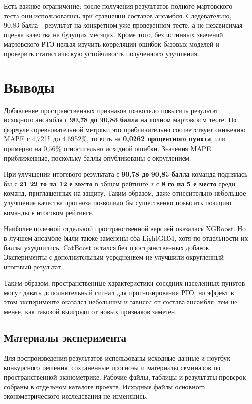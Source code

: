 \documentclass[12pt, a4paper]{article}
\begin{document}
Есть важное ограничение: после получения результатов полного мартовского теста они использовались при сравнении составов ансамбля.
Следовательно, 90,83 балла - результат на конкретном уже проверенном тесте, а не независимая оценка качества на будущих месяцах.
Кроме того, без истинных значений мартовского РТО нельзя изучить корреляции ошибок базовых моделей и проверить статистическую
устойчивость полученного улучшения.

\clearpage

\section*{Выводы}

Добавление пространственных признаков позволило повысить результат исходного ансамбля с \textbf{90,78 до 90,83 балла}
на полном мартовском тесте. По формуле соревновательной метрики это приблизительно соответствует снижению MAPE с 4,7215 до 4,6952\%,
то есть на \textbf{0,0262 процентного пункта}, или примерно на 0,56\% относительно исходной ошибки.
Значения MAPE приближенные, поскольку баллы опубликованы с округлением.

При улучшении итогового результата с \textbf{90,78 до 90,83 балла} команда поднялась бы с \textbf{21-22-го на 12-е место}
в общем рейтинге и с \textbf{8-го на 5-е место} среди команд, приглашенных на защиту.
Таким образом, даже относительно небольшое улучшение качества прогноза позволило бы существенно повысить позицию команды в
итоговом рейтинге.

Наиболее полезной отдельной пространственной версией оказалась XGBoost. Но в лучшем ансамбле были также заменены
оба LightGBM, хотя по отдельности их баллы ухудшились. CatBoost остался без пространственных добавок. Эксперименты
с дополнительным усреднением не улучшили округленный итоговый результат.

Таким образом, пространственные характеристики соседних населенных пунктов могут давать дополнительный сигнал для прогнозирования РТО,
но эффект в этом эксперименте оказался небольшим и зависел от состава ансамбля; тем не менее, как таковой выигрыш от новых признаков заметен.

\subsection*{Материалы эксперимента}

Для воспроизведения результатов использованы исходные данные и ноутбук конкурсного решения, сохраненные прогнозы и
материалы семинаров по пространственной эконометрике. Рабочие файлы, таблицы и результаты проверок собраны в
отдельном каталоге проекта. Исходные файлы основного эконометрического исследования не изменялись.
\end{document}
